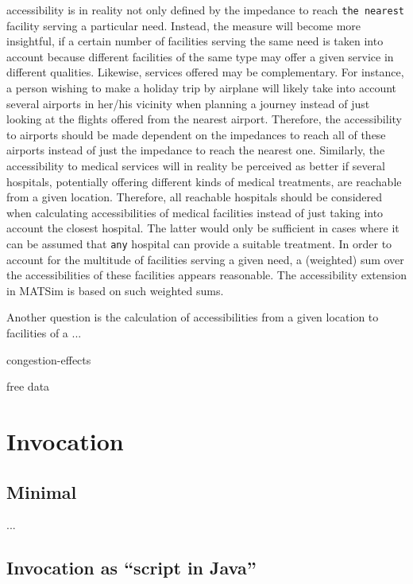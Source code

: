 accessibility is in reality not only defined by the impedance to reach \texttt{the nearest}
facility serving a particular need. Instead, the measure will become more
insightful, if a certain number of facilities serving the same need is taken into
account because different facilities of the same type may offer a given service in
different qualities. Likewise, services offered may be complementary. For instance,
a person wishing to make a holiday trip by airplane will likely take into account several airports in her/his vicinity when planning a journey instead
of just looking at the flights offered from the nearest airport. Therefore, the
accessibility to airports should be made dependent on the impedances to reach all of these airports
instead of just the impedance to reach the nearest one. Similarly, the accessibility to
medical services will in reality be perceived as better if several hospitals, potentially offering
different kinds of medical treatments, are reachable from a given location. Therefore, all reachable
hospitals should be considered when calculating accessibilities of medical
facilities instead of just taking into account the closest hospital. The latter
would only be sufficient in cases where it can be assumed that \texttt{any}
hospital can provide a suitable treatment. In order to account for the multitude of facilities serving a
given need, a (weighted) sum over the accessibilities of these facilities appears
reasonable. The accessibility extension in MATSim is based on such weighted sums.

Another question is the calculation of accessibilities from a given location to facilities of a ...



congestion-effects

free data

\section{Invocation}

\subsection{Minimal}

...



\subsection{Invocation as ``script in Java''}

